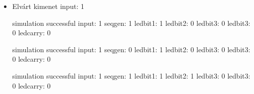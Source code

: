 \begin{itemize}
{\bf Felhasználó ténykedései:}\newline
switch input\newline
step\newline
step\newline

step\newline
step\newline

switch input\newline
step\newline
step\newline

switch input\newline
step \newline
step \newline


\item Elvárt kimenet\newline
input: 1\newline

simulation successful\newline
input: 1\newline
seqgen: 1\newline
ledbit1: 1\newline
ledbit2: 0\newline
ledbit3: 0\newline
ledbit3: 0\newline
ledcarry: 0\newline

simulation successful\newline
input: 1\newline
seqgen: 0\newline
ledbit1: 1\newline
ledbit2: 0\newline
ledbit3: 0\newline
ledbit3: 0\newline
ledcarry: 0\newline

simulation successful\newline
input: 1\newline
seqgen: 1\newline
ledbit1: 1\newline
ledbit2: 1\newline
ledbit3: 0\newline
ledbit3: 0\newline
ledcarry: 0\newline


\end{itemize}
